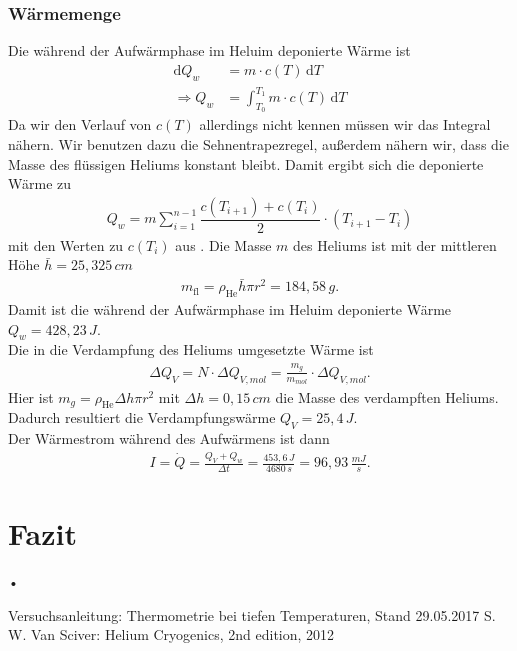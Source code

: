\documentclass[twoside,colorback,accentcolor=tud4c,11pt]{tudreport}
\begin{document}
\subsection{Wärmemenge}
Die während der Aufwärmphase im Heluim deponierte Wärme ist 
\begin{align}
\mathrm{d}Q_w&=m\cdot c(T)\,\mathrm{d}T\\
\Rightarrow Q_w&=\int_{T_0}^{T_1}m\cdot c(T)\,\mathrm{d}T
\end{align}
Da wir den Verlauf von $ c(T) $ allerdings nicht kennen müssen wir das Integral nähern. Wir benutzen dazu die Sehnentrapezregel, außerdem nähern wir, dass die Masse des flüssigen Heliums konstant bleibt. Damit ergibt sich die deponierte Wärme zu
\begin{align}
Q_w=m\sum_{i=1}^{n-1}\dfrac{c(T_{i+1})+c(T_{i})}{2}\cdot(T_{i+1}-T_i)
\end{align}
mit den Werten zu $ c(T_{i}) $ aus \cite{Sciver}. Die Masse $m$ des Heliums ist mit der mittleren Höhe $\bar{h}=25,325\,\si{cm}$
\begin{align}
m_{\mathrm{fl}}=\rho_{\mathrm{He}}\bar{h}\pi r^2=184,58\,\si{g}.
\end{align}
Damit ist die während der Aufwärmphase im Heluim deponierte Wärme $ Q_w=428,23\,\si{J} $.\\
Die in die Verdampfung des Heliums umgesetzte Wärme ist 
\begin{align}
\Delta Q_{V}=N\cdot\Delta Q_{V,\si{mol}}=\frac{m_g}{m_{\si{mol}}}\cdot\Delta Q_{V,\si{mol}}.
\end{align}
Hier ist $ m_g=\rho_{\mathrm{He}}\Delta h\pi r^2$ mit $ \Delta h=0,15\,\si{cm} $ die Masse des verdampften Heliums. Dadurch resultiert die Verdampfungswärme $ Q_{V}=25,4\,\si{J} $. \\
Der Wärmestrom während des Aufwärmens ist dann
\begin{align}
I=\dot{Q}=\frac{Q_V+Q_w}{\Delta t}=\frac{453,6\,\si{J}}{4680\,\si{s}}=96,93\,\si{\frac{mJ}{s}}.
\end{align}
\chapter{Fazit}	
•
\renewcommand{\bibname}{Literatur}
\begin{thebibliography}{0}
 Versuchsanleitung: Thermometrie bei tiefen Temperaturen, Stand 29.05.2017
 S. W. Van Sciver: Helium Cryogenics, 2nd edition, 2012

\end{thebibliography}
\end{document}
